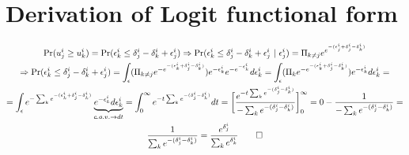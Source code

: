 \documentclass[11pt]{article}
\numberwithin{equation}{section}
\begin{document}
\section{Derivation of Logit functional form}
\label{logitderiv}
\begin{equation*}
  \begin{gathered}
  \text{Pr}(u^i_j \geq u^i_k) = \text{Pr}(\epsilon^i_k \leq \delta^i_j - \delta^i_k + \epsilon^i_j ) \Rightarrow  \text{Pr}(\epsilon^i_k \leq \delta^i_j - \delta^i_k + \epsilon^i_j  ~|~ \epsilon^i_j) = \Pi_{k \neq j} e^{e^{- (\epsilon^i_j + \delta^i_j - \delta^i_k)}} \\
  \Rightarrow \text{Pr}(\epsilon^i_k \leq \delta^i_j - \delta^i_k + \epsilon^i_j ) = \int_\epsilon (\Pi_{k \neq j} e^{-e^{- (\epsilon^i_k + \delta^i_j - \delta^i_k)}}) e^{- \epsilon^i_k}e^{-e^{- \epsilon^i_k}} d \epsilon^i_k = \int_\epsilon (\Pi_{k} e^{-e^{- (\epsilon^i_k + \delta^i_j - \delta^i_k)}}) e^{- \epsilon^i_k} d \epsilon^i_k = \\
  = \int_\epsilon e^{-\sum_{k}{e^{- (\epsilon^i_k + \delta^i_j - \delta^i_k)}}} \underbrace{e^{- \epsilon^i_k} d \epsilon^i_k}_{c.o.v. \rightarrow dt} =
  \int^\infty_0 e^{-t \sum_{k}{e^{- (\delta^i_j - \delta^i_k)}}} dt = \bigg[\frac{e^{-t \sum_{k}{e^{- (\delta^i_j - \delta^i_k)}}}}{- \sum_{k}{e^{- (\delta^i_j - \delta^i_k)}}}\bigg]^\infty_0 = 0 - \frac{1}{- \sum_{k}{e^{- (\delta^i_j - \delta^i_k)}}} = \\
  \frac{1}{\sum_{k}{e^{- (\delta^i_j - \delta^i_k)}}} = \frac{e^{\delta^i_j}} {\sum_{k}{e^{\delta^i_k}}} \qed
  \end{gathered}
\end{equation*}
\end{document}
